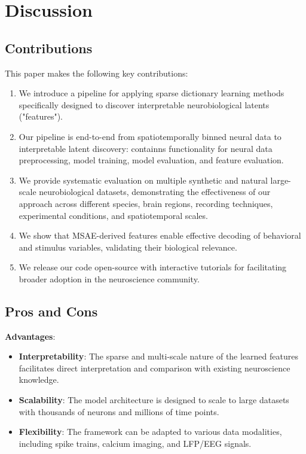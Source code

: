 \section{Discussion}

\subsection{Contributions}

This paper makes the following key contributions:

\begin{enumerate}
\item We introduce a pipeline for applying sparse dictionary learning methods specifically designed to discover interpretable neurobiological latents ("features").

\item Our pipeline is end-to-end from spatiotemporally binned neural data to interpretable latent discovery: containns functionality for neural data preprocessing, model training, model evaluation, and feature evaluation.

\item We provide systematic evaluation on multiple synthetic and natural large-scale neurobiological datasets, demonstrating the effectiveness of our approach across different species, brain regions, recording techniques, experimental conditions, and spatiotemporal scales.

\item We show that MSAE-derived features enable effective decoding of behavioral and stimulus variables, validating their biological relevance.

\item We release our code open-source with interactive tutorials for facilitating broader adoption in the neuroscience community.
\end{enumerate}

\subsection{Pros and Cons}

\textbf{Advantages}:
\begin{itemize}
    \item \textbf{Interpretability}: The sparse and multi-scale nature of the learned features facilitates direct interpretation and comparison with existing neuroscience knowledge.
    \item \textbf{Scalability}: The model architecture is designed to scale to large datasets with thousands of neurons and millions of time points.
    \item \textbf{Flexibility}: The framework can be adapted to various data modalities, including spike trains, calcium imaging, and LFP/EEG signals.
\end{itemize}

